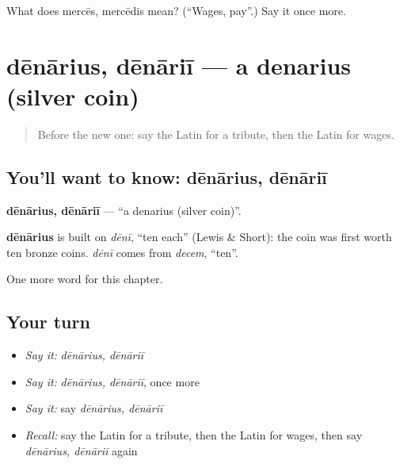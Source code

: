\begin{tcolorbox}[breakable,colback=teal!4,colframe=teal!35!black,title={Before you move on}]
What does mercēs, mercēdis mean? (\textquotedblleft{}Wages, pay\textquotedblright{}.) Say it once more.
\end{tcolorbox}
\section[dēnārius, dēnāriī]{dēnārius, dēnāriī — a denarius (silver coin)}

\label{lesson:LA-C190-denarius}



\begin{quote}
Before the new one: say the Latin for a tribute, then the Latin for wages.
\end{quote}

\subsection*{You'll want to know: dēnārius, dēnāriī}
\textbf{dēnārius, dēnāriī} — \textquotedblleft{}a denarius (silver coin)\textquotedblright{}.

\begin{cousinweb}
\textbf{dēnārius} is built on \emph{dēnī}, \textquotedblleft{}ten each\textquotedblright{} (Lewis \& Short): the coin was first worth ten bronze coins. \emph{dēnī} comes from \emph{decem}, \textquotedblleft{}ten\textquotedblright{}.
\end{cousinweb}

\begin{grammarlens}[title={What you've built}]
One more word for this chapter.
\end{grammarlens}

\subsection*{Your turn}
\begin{itemize}
\raggedright
  \item \emph{Say it:} \emph{dēnārius, dēnāriī}
  \item \emph{Say it:} \emph{dēnārius, dēnāriī}, once more
  \item \emph{Say it:} say \emph{dēnārius, dēnāriī}
  \item \emph{Recall:} say the Latin for a tribute, then the Latin for wages, then say \emph{dēnārius, dēnāriī} again
\end{itemize}


